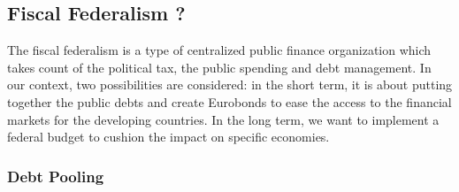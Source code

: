 \documentclass[12pt]{article}
\begin{document}
\subsection{Fiscal Federalism ?}

The fiscal federalism is a type of centralized public finance organization which takes count of the political tax, the public spending and debt management. In our context, two possibilities are considered: in the short term, it is about putting together the public debts and create Eurobonds to ease the access to the financial markets for the developing countries. In the long term, we want to implement a federal budget to cushion the impact on specific economies.

\subsubsection{Debt Pooling}
\end{document}
